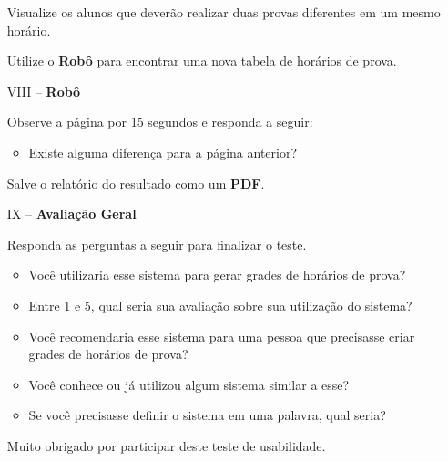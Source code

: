 \begin{apendicesenv}
\begin{enumerate}
Visualize os alunos que deverão realizar duas provas diferentes em um mesmo horário.

Utilize o \textbf{Robô} para encontrar uma nova tabela de horários de prova.

    \item[VIII --] \textbf{Robô}
    
Observe a página por 15 segundos e responda a seguir:

\begin{itemize}
    \item Existe alguma diferença para a página anterior? 
\end{itemize}

Salve o relatório do resultado como um \textbf{PDF}.

    \item[IX --] \textbf{Avaliação Geral}
    
Responda as perguntas a seguir para finalizar o teste.

\begin{itemize}
    \item Você utilizaria esse sistema para gerar grades de horários de prova?
    \item Entre 1 e 5, qual seria sua avaliação sobre sua utilização do sistema?
    \item Você recomendaria esse sistema para uma pessoa que precisasse criar grades de horários de prova?
    \item Você conhece ou já utilizou algum sistema similar a esse?
    \item Se você precisasse definir o sistema em uma palavra, qual seria?
\end{itemize}

Muito obrigado por participar deste teste de usabilidade.

\end{enumerate}

\end{apendicesenv}
